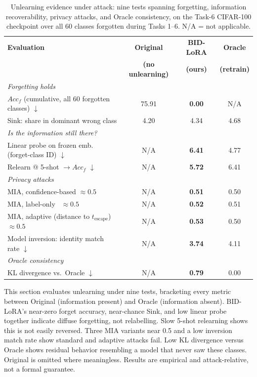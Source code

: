 \begin{table}[!htbp]
\centering
\footnotesize
\caption{Unlearning evidence under attack: nine tests spanning forgetting, information recoverability, privacy attacks, and Oracle consistency, on the Task-6 CIFAR-100 checkpoint over all 60 classes forgotten during Tasks 1--6. N/A = not applicable.}
\label{tab:unlearning_evidence}

\begin{tabular}{lccc}
\toprule
\textbf{Evaluation} & \textbf{Original} & \textbf{BID-LoRA} & \textbf{Oracle} \\
                    & \textbf{(no unlearning)} & \textbf{(ours)} & \textbf{(retrain)} \\
\midrule
\multicolumn{4}{l}{\textit{Forgetting holds}} \\
\quad $Acc_f$ (cumulative, all 60 forgotten classes) $\downarrow$ & 75.91 & \textbf{0.00} & N/A \\
\quad Sink: share in dominant wrong class & 4.20 & 4.34 & 4.68 \\
\midrule
\multicolumn{4}{l}{\textit{Is the information still there?}} \\
\quad Linear probe on frozen emb. (forget-class ID) $\downarrow$ & N/A & \textbf{6.41} & 4.77 \\
\quad Relearn @ 5-shot $\rightarrow Acc_f$ $\downarrow$ & N/A & \textbf{5.72} & 6.41 \\
\midrule
\multicolumn{4}{l}{\textit{Privacy attacks}} \\
\quad MIA, confidence-based $\approx 0.5$ & N/A & \textbf{0.51} & 0.50 \\
\quad MIA, label-only~\cite{choquette2021label} $\approx 0.5$ & N/A & \textbf{0.52} & 0.51 \\
\quad MIA, adaptive (distance to $t_{\text{escape}}$) $\approx 0.5$ & N/A & \textbf{0.53} & 0.50 \\
\quad Model inversion: identity match rate $\downarrow$ & N/A & \textbf{3.74} & 4.11 \\
\midrule
\multicolumn{4}{l}{\textit{Oracle consistency}} \\
\quad KL divergence vs.\ Oracle $\downarrow$ & N/A & \textbf{0.79} & 0.00 \\
\bottomrule
\end{tabular}

\end{table}

This section evaluates unlearning under nine tests, bracketing every metric between Original (information present) and Oracle (information absent). BID-LoRA's near-zero forget accuracy, near-chance Sink, and low linear probe together indicate diffuse forgetting, not relabelling. Slow 5-shot relearning shows this is not easily reversed. Three MIA variants near 0.5 and a low inversion match rate show standard and adaptive attacks fail. Low KL divergence versus Oracle shows residual behavior resembling a model that never saw these classes. Original is omitted where meaningless. Results are empirical and attack-relative, not a formal guarantee.
